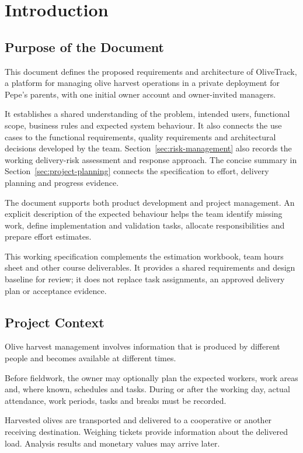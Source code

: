 \section{Introduction}
\label{sec:introduction}

\subsection{Purpose of the Document}

This document defines the proposed requirements
and architecture of OliveTrack, a platform
for managing olive harvest operations in a private deployment for Pepe's parents,
with one initial owner account and owner-invited managers.

It establishes a shared understanding of the problem,
intended users, functional scope, business rules
and expected system behaviour.
It also connects the use cases to the functional
requirements, quality requirements
and architectural decisions developed by the team.
Section~\ref{sec:risk-management} also records the working delivery-risk assessment
and response approach. The concise summary in Section~\ref{sec:project-planning}
connects the specification to effort, delivery planning and progress evidence.

The document supports both product development
and project management.
An explicit description of the expected behaviour
helps the team identify missing work,
define implementation and validation tasks,
allocate responsibilities and prepare effort estimates.

This working specification complements the estimation workbook, team hours
sheet and other course deliverables. It provides a shared requirements and design
baseline for review; it does not replace task assignments, an approved delivery
plan or acceptance evidence.

\subsection{Project Context}

Olive harvest management involves information
that is produced by different people
and becomes available at different times.

Before fieldwork, the owner may optionally plan the expected workers,
work areas and, where known, schedules and tasks.
During or after the working day, actual attendance,
work periods, tasks and breaks must be recorded.

Harvested olives are transported and delivered
to a cooperative or another receiving destination.
Weighing tickets provide information about
the delivered load.
Analysis results and monetary values may arrive later.

